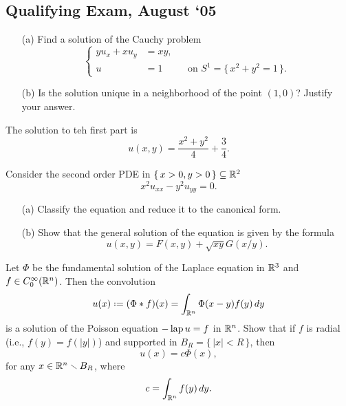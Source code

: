 \subsection{Qualifying Exam, August `05}
\begin{problem}
  \hfill
  \begin{itemize}[noitemsep]
  \item[(a)] Find a solution of the Cauchy problem
    \[
      \left\{
        \begin{aligned}
          yu_x+xu_y&=xy,\\
          u&=1&&\text{on \(S^1=\bigl\{\,x^2+y^2=1\,\bigr\}\)}.
        \end{aligned}
      \right.
    \]
  \item[(b)] Is the solution unique in a neighborhood of the point
    \((1,0)\)? Justify your answer.
  \end{itemize}
\end{problem}
\begin{solution*}
  The solution to teh first part is
  \[
    u(x,y)=\frac{x^2+y^2}{4}+\frac{3}{4}.
  \]
\end{solution*}

\begin{problem}
  Consider the second order PDE in \(\{\,x>0,y>0\,\}\subseteq\mathbb{R}^2\)
  \[
    x^2u_{xx}-y^2u_{yy}=0.
  \]
  \begin{itemize}[noitemsep]
  \item[(a)] Classify the equation and reduce it to the canonical form.
  \item[(b)] Show that the general solution of the equation is given by the
    formula
    \[
      u(x,y)=F(x,y)+\sqrt{xy}G(x/y).
    \]
  \end{itemize}
\end{problem}
\begin{solution*}
\end{solution*}

\begin{problem}
  Let \(\Phi\) be the fundamental solution of the Laplace equation in
  \(\mathbb{R}^3\) and \(f\in C_0^\infty(\mathbb{R}^n)\). Then the convolution
  \[
    u(x)\defeq(\Phi*f)(x)=\int_{\bbR^n}\Phi(x-y)f(y)\diff y
  \]
  is a solution of the Poisson equation \(-\operatorname{lap} u=f\) in \(\mathbb{R}^n\). Show
  that if \(f\) is radial (i.e., \(f(y)=f(|y|)\)) and supported in
  \(B_R=\{\,|x|<R\,\}\), then
  \[
    u(x)=c\Phi(x),
  \]
  for any \(x\in\mathbb{R}^n\smallsetminus B_R\), where
  \[
    c=\int_{\mathbb{R}^n}f(y)\mathop{}\!d y.
  \]

\end{problem}
\begin{solution*}
\end{solution*}

